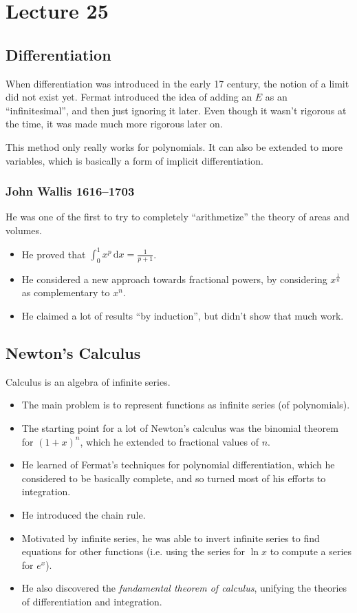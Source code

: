 \documentclass[class=article, crop=false]{standalone}
\begin{document}
  \section{Lecture 25}
  \subsection{Differentiation}
  When differentiation was introduced in the early 17 century, the notion of a limit did not exist yet. Fermat introduced the idea of adding an $E$ as an ``infinitesimal'', and then just ignoring it later. Even though it wasn't rigorous at the time, it was made much more rigorous later on.
  \begin{note}{}
    This method only really works for polynomials. It can also be extended to more variables, which is basically a form of implicit differentiation.
  \end{note}
  \subsubsection{John Wallis 1616--1703}
  He was one of the first to try to completely ``arithmetize'' the theory of areas and volumes.
  \begin{itemize}
    \item He proved that $\int_{0}^{1}x^p \,\mathrm dx = \frac{1}{p + 1}$.
    \item He considered a new approach towards fractional powers, by considering $x^{\frac{1}{n}}$ as complementary to $x^n$.
    \item He claimed a lot of results ``by induction'', but didn't show that much work.
  \end{itemize}
  \subsection{Newton's Calculus}
  Calculus is an algebra of infinite series.
  \begin{itemize}
    \item The main problem is to represent functions as infinite series (of polynomials).
    \item The starting point for a lot of Newton's calculus was the binomial theorem for $(1 + x)^n$, which he extended to fractional values of $n$.
    \item He learned of Fermat's techniques for polynomial differentiation, which he considered to be basically complete, and so turned most of his efforts to integration.
    \item He introduced the chain rule.
    \item Motivated by infinite series, he was able to invert infinite series to find equations for other functions (i.e. using the series for $\ln x$ to compute a series for $e^x$).
    \item He also discovered the \emph{fundamental theorem of calculus}, unifying the theories of differentiation and integration.
  \end{itemize}
\end{document}

